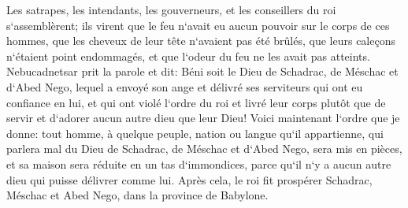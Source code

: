 \verse Les satrapes, les intendants, les gouverneurs, et les conseillers du roi s`assemblèrent; ils virent que le feu n`avait eu aucun pouvoir sur le corps de ces hommes, que les cheveux de leur tête n`avaient pas été brûlés, que leurs caleçons n`étaient point endommagés, et que l`odeur du feu ne les avait pas atteints. 
\verse Nebucadnetsar prit la parole et dit: Béni soit le Dieu de Schadrac, de Méschac et d`Abed Nego, lequel a envoyé son ange et délivré ses serviteurs qui ont eu confiance en lui, et qui ont violé l`ordre du roi et livré leur corps plutôt que de servir et d`adorer aucun autre dieu que leur Dieu! 
\verse Voici maintenant l`ordre que je donne: tout homme, à quelque peuple, nation ou langue qu`il appartienne, qui parlera mal du Dieu de Schadrac, de Méschac et d`Abed Nego, sera mis en pièces, et sa maison sera réduite en un tas d`immondices, parce qu`il n`y a aucun autre dieu qui puisse délivrer comme lui. 
\verse Après cela, le roi fit prospérer Schadrac, Méschac et Abed Nego, dans la province de Babylone. 

